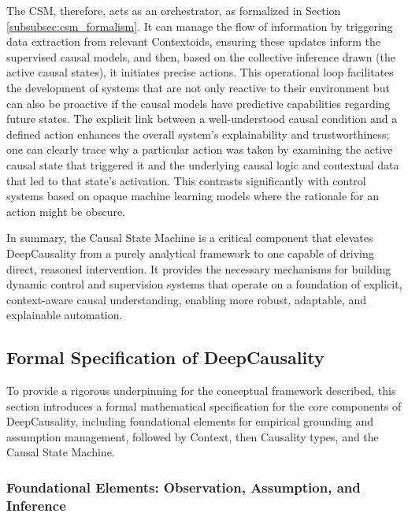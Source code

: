 The CSM, therefore, acts as an orchestrator, as formalized in Section \ref{subsubsec:csm_formalism}. It can manage the flow of information by triggering data extraction from relevant Contextoids, ensuring these updates inform the supervised causal models, and then, based on the collective inference drawn (the active causal states), it initiates precise actions. This operational loop facilitates the development of systems that are not only reactive to their environment but can also be proactive if the causal models have predictive capabilities regarding future states. The explicit link between a well-understood causal condition and a defined action enhances the overall system's explainability and trustworthiness; one can clearly trace why a particular action was taken by examining the active causal state that triggered it and the underlying causal logic and contextual data that led to that state's activation. This contrasts significantly with control systems based on opaque machine learning models where the rationale for an action might be obscure.

In summary, the Causal State Machine is a critical component that elevates DeepCausality from a purely analytical framework to one capable of driving direct, reasoned intervention. It provides the necessary mechanisms for building dynamic control and supervision systems that operate on a foundation of explicit, context-aware causal understanding, enabling more robust, adaptable, and explainable automation.

\newpage

\subsection{Formal Specification of DeepCausality} %
\label{subsec:formal_specification}

To provide a rigorous underpinning for the conceptual framework described, this section introduces a formal mathematical specification for the core components of DeepCausality, including foundational elements for empirical grounding and assumption management, followed by Context, then Causality types, and the Causal State Machine.

\subsubsection{Foundational Elements: Observation, Assumption, and Inference}
\label{subsubsec:foundational_elements_formalism}

